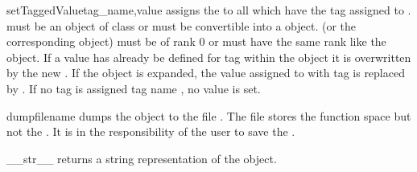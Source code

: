 \begin{methoddesc}[Data]{setTaggedValue}{tag_name,value}
assigns the  to all \DataSamplePoints which have the tag
assigned to .  must be an object of class
 or must be convertible into a
 object.  (or the corresponding
 object) must be of rank $0$ or must have the
same rank like the object.
If a value has already be defined for tag  within the object
it is overwritten by the new .  If the object is expanded,
the value assigned to \DataSamplePoints with tag  is replaced by
. If no tag is assigned tag name , no value is set.
\end{methoddesc}

\begin{methoddesc}[Data]{dump}{filename}
dumps the \Data object to the file . The file stores the
function space but not the \Domain. It is in the responsibility of the user to
save the \Domain. 
\end{methoddesc}

\begin{methoddesc}[Data]{__str__}{}
returns a string representation of the object.
\end{methoddesc}

